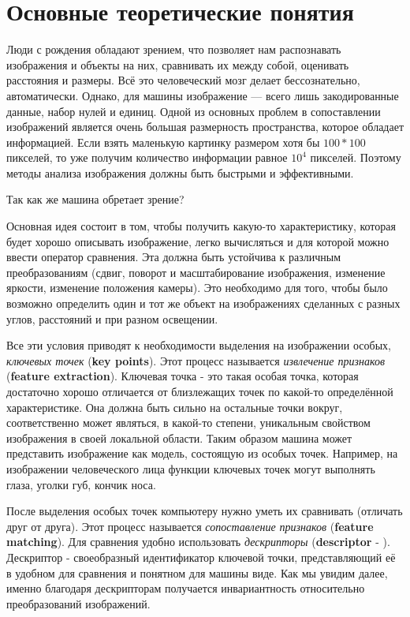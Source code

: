 \section{Основные теоретические понятия}

Люди с рождения обладают зрением, что позволяет нам распознавать изображения и объекты на них, сравнивать их между собой, оценивать расстояния и размеры. Всё это человеческий мозг делает бессознательно, автоматически. Однако, для машины изображение — всего лишь закодированные данные, набор нулей и единиц. Одной из основных проблем в сопоставлении изображений является очень большая размерность пространства, которое обладает информацией. Если взять маленькую картинку размером хотя бы $100*100$ пикселей, то уже получим количество информации равное $10^4$ пикселей. Поэтому методы анализа изображения должны быть быстрыми и эффективными.

Так как же машина обретает зрение?

Основная идея состоит в том, чтобы получить какую-то характеристику, которая будет хорошо описывать изображение, легко вычисляться и для которой можно ввести оператор сравнения. Эта  должна быть устойчива к различным преобразованиям (сдвиг, поворот и масштабирование изображения, изменение яркости, изменение положения камеры). Это необходимо для того, чтобы было возможно определить один и тот же объект на изображениях сделанных с разных углов, расстояний и при разном освещении.

Все эти условия приводят к необходимости выделения на изображении особых, \textit{ключевых точек} (\textbf{key points}). Этот процесс называется \textit{извлечение признаков} (\textbf{feature extraction}). Ключевая точка - это такая особая точка, которая достаточно хорошо отличается от близлежащих точек по какой-то определённой характеристике. Она должна быть сильно  на остальные точки вокруг, соответственно может являться, в какой-то степени, уникальным свойством изображения в своей локальной области. Таким образом машина может представить изображение как модель, состоящую из особых точек. Например, на изображении человеческого лица функции ключевых точек могут выполнять глаза, уголки губ, кончик носа.

После выделения особых точек компьютеру нужно уметь их сравнивать (отличать друг от друга). Этот процесс называется \textit{сопоставление признаков} (\textbf{feature matching}). Для сравнения удобно использовать \textit{дескрипторы} (\textbf{descriptor} - ). Дескриптор - своеобразный идентификатор ключевой точки, представляющий её в удобном для сравнения и понятном для машины виде. Как мы увидим далее, именно благодаря дескрипторам получается инвариантность относительно преобразований изображений.
